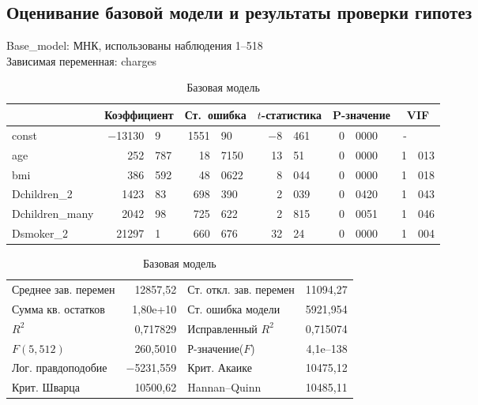 \documentclass[a4paper,12pt]{article}
\begin{document}
\subsection{Оценивание базовой модели и результаты проверки гипотез}
\begin{table}[H]
	\begin{center}	
		Base\_model:
		МНК, использованы наблюдения 1--518\\
		Зависимая переменная: charges\\
		\vspace{1em}
		\begin{tabular}{|l|r@{,}l|r@{,}l|r@{,}l|r@{,}l|r@{,}l|}
			\hline
			&
			\multicolumn{2}{c|}{Коэффициент} &
			\multicolumn{2}{c|}{Ст.\ ошибка} &
			\multicolumn{2}{c|}{$t$-статистика} &
			\multicolumn{2}{c|}{P-значение} &
			\multicolumn{2}{c|}{VIF} \\[1ex]
			\hline
			const &	$-$13130&9 & 1551&90 & $-$8&461 & 0&0000 & -& \\
			\hline
			age & 252&787 &	18&7150 & 13&51 & 0&0000 & 1&013 \\
			\hline
			bmi & 386&592 &	48&0622 & 8&044 & 0&0000 & 1&018 \\
			\hline
			Dchildren\_2 & 1423&83 & 698&390 & 2&039 & 0&0420 & 1&043 \\
			\hline
			Dchildren\_many & 2042&98 & 725&622 & 2&815 & 0&0051 & 1&046 \\
			\hline
			Dsmoker\_2 & 21297&1 & 660&676 & 32&24 & 0&0000 & 1&004 \\
			\hline
		\end{tabular}	
		\vspace{1ex}
		\begin{tabular}{lrlr}
			Среднее зав. перемен &  12857,52 & Ст. откл. зав. перемен &  11094,27 \\
			Сумма кв. остатков &  1,80\textrm{e+10} & Ст. ошибка модели &  5921,954 \\
			$R^2$ &  0,717829 & Исправленный $R^2$ &  0,715074 \\
			$F(5, 512)$ &  260,5010 & Р-значение($F$) &  4,1\textrm{e--138} \\
			Лог. правдоподобие & $-$5231,559 & Крит. Акаике &  10475,12 \\
			Крит. Шварца &  10500,62 & Hannan--Quinn &  10485,11 \\
		\end{tabular}
		\caption{Базовая модель}
		\label{tab:base}	
	\end{center}
\end{table}
\end{document}
